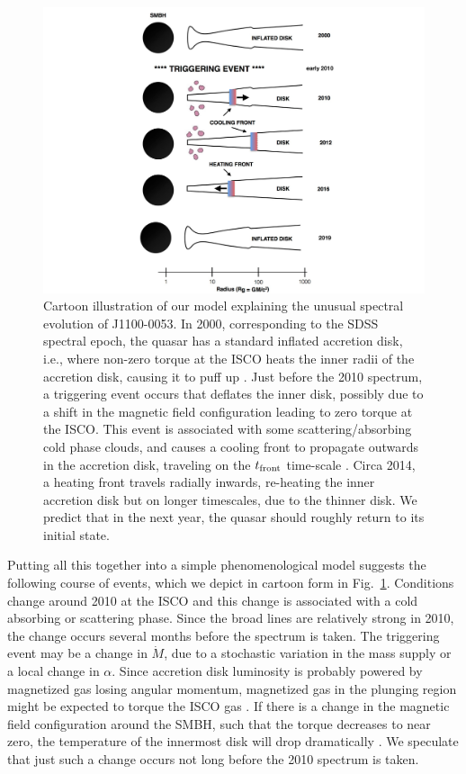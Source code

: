 \documentclass[a4paper,fleqn,usenatbib]{mnras}
\begin{document}
\begin{figure}
  \includegraphics[width=15.4cm, trim=0.0cm 0.0cm 0.0cm 0.0cm, clip]
  {../plots/models/cartoon_v4.pdf}
  \centering
  \caption[]{
    Cartoon illustration of our model explaining the unusual spectral
evolution of J1100-0053. In 2000, corresponding to the SDSS spectral
epoch, the quasar has a standard inflated accretion disk, i.e., where
non-zero torque at the ISCO heats the inner radii of the accretion
disk, causing it to puff up \citep[e.g.,][]{Zimmerman2005}. Just
before the 2010 spectrum, a triggering event occurs that deflates the
inner disk, possibly due to a shift in the magnetic field
configuration leading to zero torque at the ISCO.  This event is
associated with some scattering/absorbing cold phase clouds, and
causes a cooling front to propagate outwards in the accretion disk,
traveling on the $t_{\rm front}$ time-scale \citep[see
also][]{Hameury2009}.  Circa 2014, a heating front travels radially
inwards, re-heating the inner accretion disk but on longer timescales,
due to the thinner disk. We predict that in the next year, the quasar
should roughly return to its initial state.}
  \label{fig:J110057_cartoon}
\end{figure}
Putting all this together into a simple phenomenological model
suggests the following course of events, which we depict in cartoon
form in Fig.~\ref{fig:J110057_cartoon}.  Conditions change around
2010 at the ISCO and this change is associated with a cold absorbing
or scattering phase. Since the broad lines are relatively strong in
2010, the change occurs several months before the spectrum is
taken. The triggering event may be a change in $\dot{M}$, due to a
stochastic variation in the mass supply or a local change in
$\alpha$. Since accretion disk luminosity is probably powered by
magnetized gas losing angular momentum, magnetized gas in the plunging
region might be expected to torque the ISCO gas \citep[e.g.,
][]{Gammie1999, Agol_Krolik2000}. If there is a change in the magnetic
field configuration around the SMBH, such that the torque decreases to
near zero, the temperature of the innermost disk will drop
dramatically \citep{Cao2003}.  We speculate that just such a change
occurs not long before the 2010 spectrum is taken. 
\end{document}
